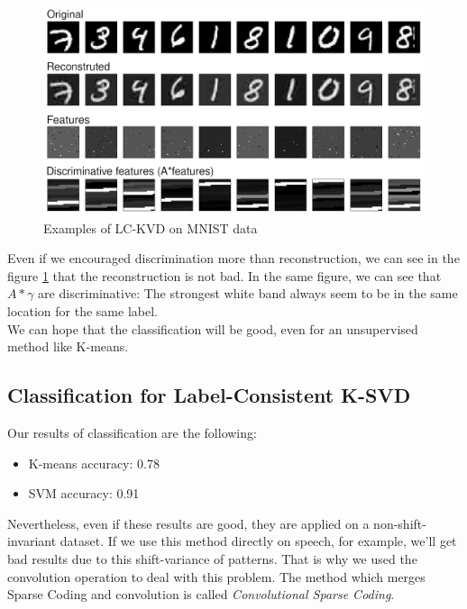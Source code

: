 \begin{figure}[h]
 \centering
 \includegraphics[scale=0.4]{MNIST_LCKSVD.png}
 \caption{Examples of  LC-KVD on MNIST data}
 \label{fig:MNIST_LC}
\end{figure}
Even if we encouraged discrimination more than reconstruction, we can see in the figure \ref{fig:MNIST_LC} that the reconstruction is not bad. In the same figure, we can see that $A * \gamma$ are discriminative: The strongest white band always seem to be in the same location for the same label.\\
We can hope that the classification will be good, even for an unsupervised method like K-means.\\
\subsection{Classification for Label-Consistent K-SVD}
Our results of classification are the following:
\begin{itemize}
 \item K-means accuracy: 0.78
 \item SVM accuracy: 0.91
\end{itemize}
Nevertheless,  even if these results are good, they are applied on a non-shift-invariant dataset. If we use this method directly on speech, for example, we'll get bad results due to this shift-variance of patterns. That is why we used the convolution operation to deal with this problem. The method which merges Sparse Coding and convolution is called \textit{Convolutional Sparse Coding}.



